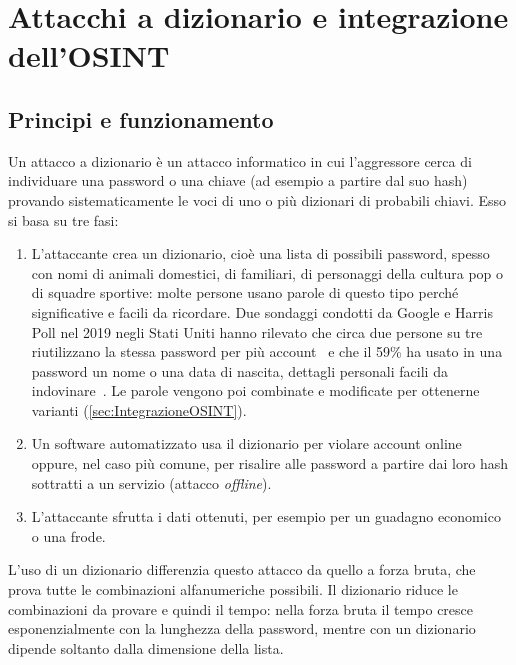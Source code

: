 \section{Attacchi a dizionario e integrazione dell'OSINT}\label{sec:AttacchiDizionario}
\subsection{Principi e funzionamento}\label{sec:principi}
Un attacco a dizionario è un attacco informatico in cui l'aggressore cerca di individuare una password o una chiave (ad esempio a partire dal suo hash) provando sistematicamente le voci di uno o più dizionari di probabili chiavi.
Esso si basa su tre fasi:
\begin{enumerate}
    \item L'attaccante crea un dizionario, cioè una lista di possibili password, spesso con nomi di animali domestici, di familiari, di personaggi della cultura pop o di squadre sportive: molte persone usano parole di questo tipo perché significative e facili da ricordare. Due sondaggi condotti da Google e Harris Poll nel 2019 negli Stati Uniti hanno rilevato che circa due persone su tre riutilizzano la stessa password per più account~\cite{googleharris2019reuse,googleharris2019checkup} e che il 59\% ha usato in una password un nome o una data di nascita, dettagli personali facili da indovinare~\cite{googleharris2019checkup}. Le parole vengono poi combinate e modificate per ottenerne varianti (\cref{sec:IntegrazioneOSINT}).
    \item Un software automatizzato usa il dizionario per violare account online oppure, nel caso più comune, per risalire alle password a partire dai loro hash sottratti a un servizio (attacco \emph{offline}).
    \item L'attaccante sfrutta i dati ottenuti, per esempio per un guadagno economico o una frode.
\end{enumerate}
L'uso di un dizionario differenzia questo attacco da quello a forza bruta, che prova tutte le combinazioni alfanumeriche possibili. Il dizionario riduce le combinazioni da provare e quindi il tempo: nella forza bruta il tempo cresce esponenzialmente con la lunghezza della password, mentre con un dizionario dipende soltanto dalla dimensione della lista.
